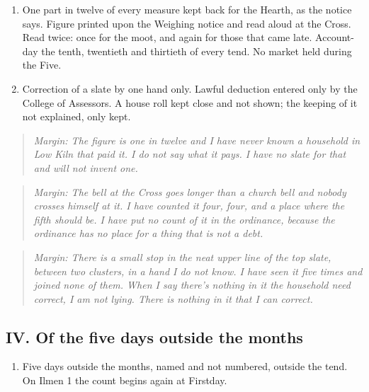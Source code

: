 \documentclass{design/chronicle}
\begin{document}
\begin{enumerate}[leftmargin=1.4em,itemsep=1pt,topsep=3pt,parsep=0pt]

\item One part in twelve of every measure kept back for the Hearth, as the notice says. Figure printed upon the Weighing notice and read aloud at the Cross. Read twice: once for the moot, and again for those that came late. Account-day the tenth, twentieth and thirtieth of every tend. No market held during the Five.

\item Correction of a slate by one hand only. Lawful deduction entered only by the College of Assessors. A house roll kept close and not shown; the keeping of it not explained, only kept.

\end{enumerate}

\begin{quote}\itshape \emph{Margin:} The figure is one in twelve and I have never known a household in Low Kiln that paid it. I do not say what it pays. I have no slate for that and will not invent one.\end{quote}

\begin{quote}\itshape \emph{Margin:} The bell at the Cross goes longer than a church bell and nobody crosses himself at it. I have counted it four, four, and a place where the fifth should be. I have put no count of it in the ordinance, because the ordinance has no place for a thing that is not a debt.\end{quote}

\begin{quote}\itshape \emph{Margin:} There is a small stop in the neat upper line of the top slate, between two clusters, in a hand I do not know. I have seen it five times and joined none of them. When I say \emph{there’s nothing in it the household need correct}, I am not lying. There is nothing in it that I can correct.\end{quote}

\subsection*{IV. Of the five days outside the months}

\begin{enumerate}[leftmargin=1.4em,itemsep=1pt,topsep=3pt,parsep=0pt]

\item Five days outside the months, named and not numbered, outside the tend. On Ilmen 1 the count begins again at Firstday.

\end{enumerate}
\end{document}

